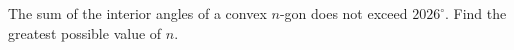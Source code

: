The sum of the interior angles of a convex $n$-gon does not exceed $2026^{\circ}$. Find the greatest possible value of $n$.
